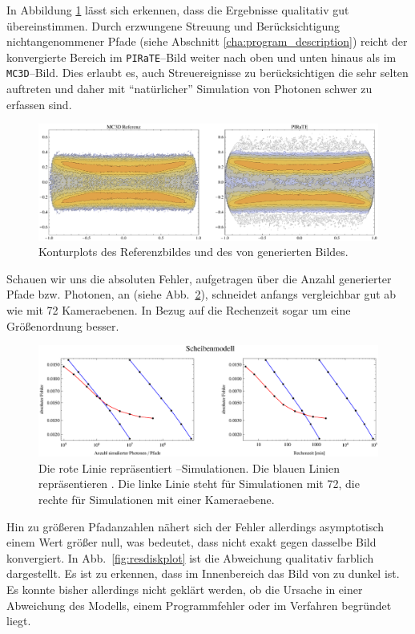 	In Abbildung \ref{fig:disk_contours}	lässt sich erkennen, dass die Ergebnisse qualitativ gut übereinstimmen. Durch erzwungene Streuung und Berücksichtigung nichtangenommener Pfade (siehe Abschnitt \ref{cha:program_description}) reicht der konvergierte Bereich im \texttt{PIRaTE}--Bild weiter nach oben und unten hinaus als im \texttt{MC3D}--Bild. Dies erlaubt es, auch Streuereignisse zu berücksichtigen die sehr selten auftreten und daher mit ``natürlicher'' Simulation von Photonen schwer zu erfassen sind.
	
		\begin{figure}
			\centering
			\includegraphics[width=1.0\textwidth]{diskcontourplots.eps}
			\caption{Konturplots des Referenzbildes und des von \pirate generierten Bildes.}
			\label{fig:disk_contours}
		\end{figure}
	
	Schauen wir uns die absoluten Fehler, aufgetragen über die Anzahl generierter Pfade bzw. Photonen, an (siehe Abb.~\ref{fig:disk_error}), schneidet \pirate anfangs vergleichbar gut ab wie \mctd mit 72 Kameraebenen. In Bezug auf die Rechenzeit sogar um eine Größenordnung besser.
	
		\begin{figure}
			\centering
			\includegraphics[width=1.0\textwidth]{diskerrorplot.eps}
			\caption{Die rote Linie repräsentiert \pirate--Simulationen. Die blauen Linien repräsentieren \mctd. Die linke Linie steht für Simulationen mit 72, die rechte für Simulationen mit einer Kameraebene.}
			\label{fig:disk_error}
		\end{figure}
	
	Hin zu größeren Pfadanzahlen nähert sich der Fehler allerdings asymptotisch einem Wert größer null, was bedeutet, dass \pirate nicht exakt gegen dasselbe Bild konvergiert. In Abb.~\ref{fig:resdiskplot} ist die Abweichung qualitativ farblich dargestellt. Es ist zu erkennen, dass im Innenbereich das Bild von \pirate zu dunkel ist. Es konnte bisher allerdings nicht geklärt werden, ob die Ursache in einer Abweichung des Modells, einem Programmfehler oder im Verfahren begründet liegt.
	
